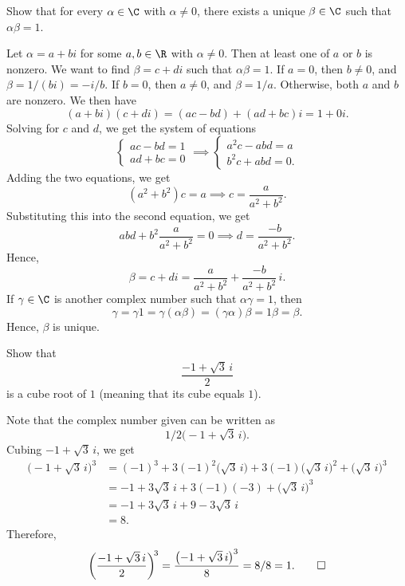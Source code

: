 \begin{exercise}
Show that for every $\alpha\in\C$ with $\alpha\ne0$, there exists a unique
$\beta\in\C$ such that $\alpha\beta=1$.
\end{exercise}
\begin{solution}
Let $\alpha=a+bi$ for some $a,b\in\R$ with $\alpha\ne0$. Then at least one of
$a$ or $b$ is nonzero. We want to find $\beta=c+di$ such that $\alpha\beta=1$.
If $a=0$, then $b\ne0$, and $\beta=1/(bi)=-i/b$. If $b=0$, then $a\ne0$, and
$\beta=1/a$. Otherwise, both $a$ and $b$ are nonzero. We then have
\[ (a+bi)(c+di) = (ac-bd)+(ad+bc)i = 1+0i. \]
Solving for $c$ and $d$, we get the system of equations
\[ \begin{cases} ac-bd=1\\ ad+bc=0 \end{cases}
   \implies
   \begin{cases} a^2c-abd=a\\ b^2c+abd=0. \end{cases} \]
Adding the two equations, we get
\[ (a^2+b^2)c=a \implies c=\frac{a}{a^2+b^2}. \]
Substituting this into the second equation, we get
\[ abd+b^2\frac{a}{a^2+b^2}=0 \implies d=\frac{-b}{a^2+b^2}. \]
Hence,
\[ \beta=c+di=\frac{a}{a^2+b^2}+\frac{-b}{a^2+b^2}\,i. \]
If $\gamma\in\C$ is another complex number such that $\alpha\gamma=1$, then
\[ \gamma=\gamma1=\gamma(\alpha\beta)=(\gamma\alpha)\beta=1\beta=\beta. \]
Hence, $\beta$ is unique.
\end{solution}

\begin{exercise}
Show that
\[ \frac{-1+\sqrt3\,i}{2} \]
is a cube root of $1$ (meaning that its cube equals $1$).
\end{exercise}
\begin{solution}
Note that the complex number given can be written as
\[ 1/2\bigl(-1+\sqrt3\,i\bigr). \]
Cubing $-1+\sqrt3\,i$, we get
\begin{align*}
\bigl(-1+\sqrt3\,i\bigr)^3
  &= (-1)^3+3(-1)^2\bigl(\sqrt3\,i\bigr)+3(-1)\bigl(\sqrt3\,i\bigr)^2+\bigl(\sqrt3\,i\bigr)^3\\
  &= -1+3\sqrt3\,i+3(-1)(-3)+\bigl(\sqrt3\,i\bigr)^3\\
  &= -1+3\sqrt3\,i+9-3\sqrt3\,i\\
  &= 8.
\end{align*}
Therefore,
\[ \biggl(\frac{-1+\sqrt3\,i}{2}\biggr)^{\!3}
   = \frac{\bigl(-1+\sqrt3\,i\bigr)^3}{8} = 8/8 = 1. \qedhere \]
\end{solution}

